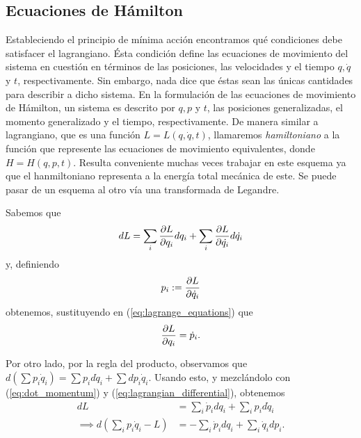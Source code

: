 
\subsection{Ecuaciones de Hámilton}
\label{sec:hamilton}

Estableciendo el principio de mínima acción encontramos qué condiciones debe satisfacer el lagrangiano. Ésta condición define las ecuaciones de movimiento del sistema en cuestión en términos de las posiciones, las velocidades y el tiempo $q, \dot{q}$ y $t$, respectivamente. Sin embargo, nada dice que éstas sean las únicas cantidades para describir a dicho sistema. En la formulación de las ecuaciones de movimiento de Hámilton, un sistema es descrito por $q,p$ y $t$, las posiciones generalizadas, el momento generalizado y el tiempo, respectivamente. De manera similar a lagrangiano, que es una función $L = L(q,\dot{q},t)$, llamaremos \textit{hamiltoniano} a la función que represente las ecuaciones de movimiento equivalentes, donde $H = H(q,p,t)$. Resulta conveniente muchas veces trabajar en este esquema ya que el hanmiltoniano representa a la energía total mecánica de este. Se puede pasar de un esquema al otro vía una transformada de Legandre.

Sabemos que 
\begin{equation}
 dL = \sum_i \frac{\partial L}{\partial q_i} d q_i + \sum_i \frac{\partial L}{\partial \dot{q_i} }  d\dot{q_i}
 \label{eq:lagrangian_differential}
\end{equation}
y, definiendo 
\begin{equation}
 p_i := \frac{\partial L}{\partial \dot{q}_i}
\end{equation} 
obtenemos, sustituyendo en (\ref{eq:lagrange_equations}) que
\begin{equation}
 \frac{\partial L}{\partial q_i} = \dot{p}_i.
 \label{eq:dot_momentum}
\end{equation}

Por otro lado, por la regla del producto, observamos que $d\left( \sum p_i \dot{q}_i \right) = \sum p_i d \dot{q}_i + \sum d p_i \dot{q}_i$. Usando esto, y mezclándolo con (\ref{eq:dot_momentum}) y (\ref{eq:lagrangian_differential}), obtenemos
\begin{align}
 dL &= \sum_i \dot{p}_i d q_i + \sum_i p_i d \dot{q}_i \nonumber \\
 \implies d\left(\sum_i p_i \dot{q}_i - L \right) &= - \sum_i \dot{p}_i d q_i + \sum_i \dot{q}_i d p_i.
 \label{eq:legandre_ham_lag}
\end{align}

